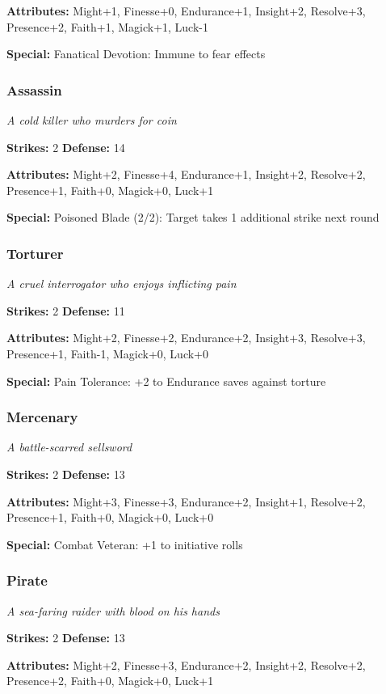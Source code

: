 \documentclass[10pt,twoside]{article}
\begin{document}
\textbf{Attributes:} Might+1, Finesse+0, Endurance+1, Insight+2, Resolve+3, Presence+2, Faith+1, Magick+1, Luck-1

\textbf{Special:} Fanatical Devotion: Immune to fear effects

\subsubsection{Assassin}
\textit{A cold killer who murders for coin}

\textbf{Strikes:} 2 \quad \textbf{Defense:} 14

\textbf{Attributes:} Might+2, Finesse+4, Endurance+1, Insight+2, Resolve+2, Presence+1, Faith+0, Magick+0, Luck+1

\textbf{Special:} Poisoned Blade (2/2): Target takes 1 additional strike next round

\subsubsection{Torturer}
\textit{A cruel interrogator who enjoys inflicting pain}

\textbf{Strikes:} 2 \quad \textbf{Defense:} 11

\textbf{Attributes:} Might+2, Finesse+2, Endurance+2, Insight+3, Resolve+3, Presence+1, Faith-1, Magick+0, Luck+0

\textbf{Special:} Pain Tolerance: +2 to Endurance saves against torture

\subsubsection{Mercenary}
\textit{A battle-scarred sellsword}

\textbf{Strikes:} 2 \quad \textbf{Defense:} 13

\textbf{Attributes:} Might+3, Finesse+3, Endurance+2, Insight+1, Resolve+2, Presence+1, Faith+0, Magick+0, Luck+0

\textbf{Special:} Combat Veteran: +1 to initiative rolls

\subsubsection{Pirate}
\textit{A sea-faring raider with blood on his hands}

\textbf{Strikes:} 2 \quad \textbf{Defense:} 13

\textbf{Attributes:} Might+2, Finesse+3, Endurance+2, Insight+2, Resolve+2, Presence+2, Faith+0, Magick+0, Luck+1
\end{document}

